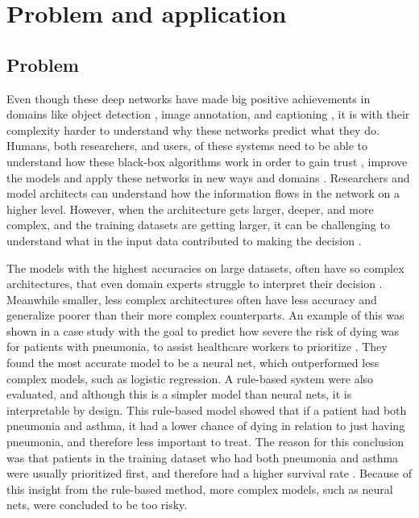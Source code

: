 \label{sec:2_problem_and_application}
\section{Problem and application}
\subsection{Problem}

Even though these deep networks have made big positive achievements in domains like object detection \cite{girshickRichFeatureHierarchies2014, renFasterRCNNRealTime2015, redmonYouOnlyLook2016, linFocalLossDense2017}, image annotation, and captioning \cite{vinyalsShowTellNeural2015, karpathyDeepVisualSemanticAlignments2015, johnsonDenseCapFullyConvolutional2016, tranRichImageCaptioning2016}, it is with their complexity harder to understand why these networks predict what they do. Humans, both researchers, and users, of these systems need to be able to understand how these black-box algorithms work in order to gain trust \cite{koehlerExplanationImaginationConfidence1991, herlockerExplainingCollaborativeFiltering2000, dzindoletRoleTrustAutomation2003}, improve the models and apply these networks in new ways and domains \cite{jiangArtificialIntelligenceHealthcare2017, tonekaboniWhatCliniciansWant2019, holzingerCausabilityExplainabilityArtificial2019, guptaDeepLearningObject2021, tjoaSurveyExplainableArtificial2021}. Researchers and model architects can understand how the information flows in the network on a higher level. However, when the architecture gets larger, deeper, and more complex, and the training datasets are getting larger, it can be challenging to understand what in the input data contributed to making the decision \cite{sagirogluBigDataReview2013}.

The models with the highest accuracies on large datasets, often have so complex architectures, that even domain experts struggle to interpret their decision  \cite{caruanaIntelligibleModelsHealthCare2015}. Meanwhile smaller, less complex architectures often have less accuracy and generalize poorer than their more complex counterparts. An example of this was shown in a case study with the goal to predict how severe the risk of dying was for patients with pneumonia, to assist healthcare workers to prioritize \cite{cooperPredictingDireOutcomes2005}. They found the most accurate model to be a neural net, which outperformed less complex models, such as logistic regression. A rule-based system were also evaluated, and although this is a simpler model than neural nets, it is interpretable by design. This rule-based model showed that if a patient had both pneumonia and asthma, it had a lower chance of dying in relation to just having pneumonia, and therefore less important to treat. The reason for this conclusion was that patients in the training dataset who had both pneumonia and asthma were usually prioritized first, and therefore had a higher survival rate \cite{cooperEvaluationMachinelearningMethods1997}. Because of this insight from the rule-based method, more complex models, such as neural nets, were concluded to be too risky.


